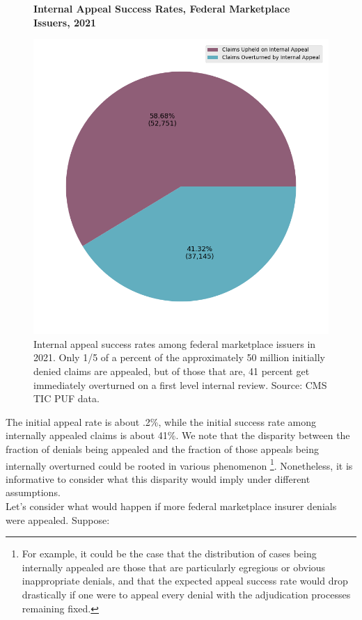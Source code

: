 \documentclass[12pt, a4paper]{report}
\begin{document}
\begin{figure}
	\centering
	\textbf{Internal Appeal Success Rates, Federal Marketplace Issuers, 2021}\par\medskip
\includegraphics[width=0.85\columnwidth]{images/cms_puf/internal_appeal_success_rates_all_insurers.png}
	\caption{ Internal appeal success rates among federal marketplace issuers in 2021. Only 1/5 of a percent of the approximately 50 million initially denied claims are appealed, but of those that are, 41 percent get immediately overturned on a first level internal review. Source: CMS TIC PUF data.}
	\label{federal_internal_appeal_success_rates}
\end{figure}


The initial appeal rate is about .2\%, while the initial success rate among internally appealed claims is about 41\%. We note that the disparity between the fraction of denials being appealed and the fraction of those appeals being internally overturned could be rooted in various phenomenon \footnote{For example, it could be the case that the distribution of cases being internally appealed are those that are particularly egregious or obvious inappropriate denials, and that the expected appeal success rate would drop drastically if one were to appeal every denial with the adjudication processes remaining fixed.}. Nonetheless, it is informative to consider what this disparity would imply under different assumptions. \\

Let's consider what would happen if more federal marketplace insurer denials were appealed. Suppose:
\end{document}
